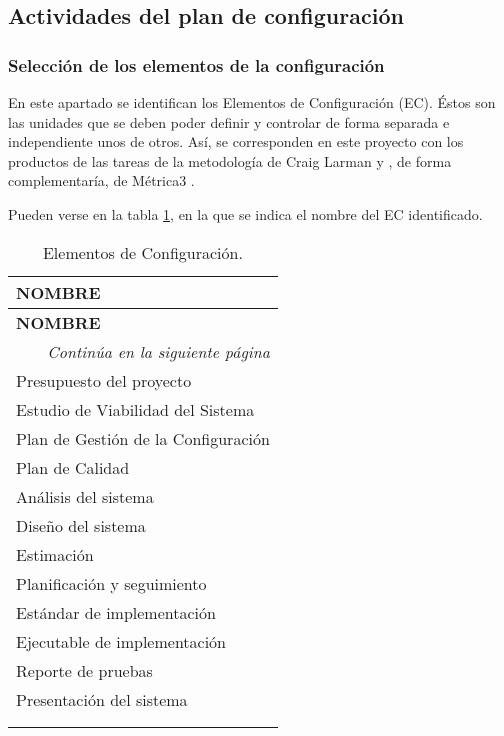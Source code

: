\subsection{Actividades del plan de configuración}

\subsubsection{Selección de los elementos de la configuración}
\par En este apartado se identifican los Elementos de Configuración (EC). Éstos son las unidades que se deben poder definir y controlar de forma separada e independiente unos de otros. Así, se corresponden en este proyecto con los productos de las tareas de la metodología de Craig Larman \cite{ART:CraigLarman} y , de forma complementaría, de Métrica3 \cite{WEB:Metrica3}.
\par Pueden verse en la tabla \ref{tab:EC}, en la que se indica el nombre del EC identificado.


\begin{center}
\begin{longtable}{l}

\textbf{NOMBRE} \\\hline \hline
\endfirsthead
\textbf{NOMBRE} \\\hline \hline
\endhead

\hline \multicolumn{1}{r}{\textit{Continúa en la siguiente página}} \\
\endfoot
\endlastfoot

Presupuesto del proyecto\\
Estudio de Viabilidad del Sistema\\
Plan de Gestión de la Configuración\\
Plan de Calidad\\
Análisis del sistema\\
Diseño del sistema\\
Estimación\\
Planificación y seguimiento\\
Estándar de implementación\\
Ejecutable de implementación\\
Reporte de pruebas\\
Presentación del sistema\\\hline

\caption{Elementos de Configuración.}\\
\label{tab:EC}
\end{longtable}
\end{center}

